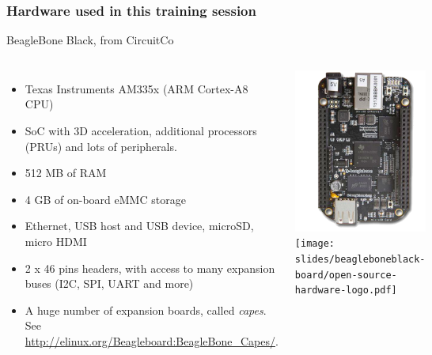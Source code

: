 \begin{frame}
\frametitle{Hardware used in this training session}
  BeagleBone Black, from CircuitCo
  \begin{columns}
    \footnotesize
    \begin{itemize}
      \item Texas Instruments AM335x (ARM Cortex-A8 CPU)
      \item SoC with 3D acceleration, additional processors
        (PRUs) and lots of peripherals.
      \item 512 MB of RAM
      \item 4 GB of on-board eMMC storage
      \item Ethernet, USB host and USB device, microSD, micro HDMI
      \item 2 x 46 pins headers, with access to many expansion buses
        (I2C, SPI, UART and more)
      \item A huge number of expansion boards, called {\em capes}.
        See \url{http://elinux.org/Beagleboard:BeagleBone_Capes/}.
    \end{itemize}
    \begin{center}
      \includegraphics[width=\textwidth]{slides/beagleboneblack-board/beagleboneblack.png}\\
      \texttt{[image: slides/beagleboneblack-board/open-source-hardware-logo.pdf]}
    \end{center}
  \end{columns}
\end{frame}

